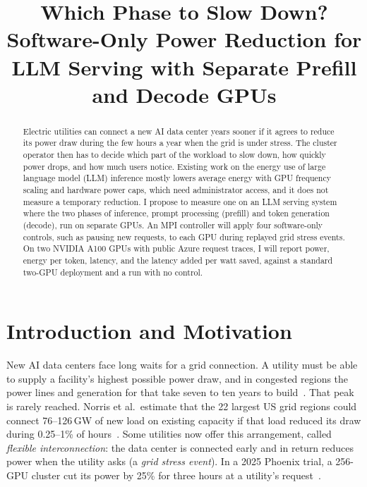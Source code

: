 \documentclass[conference,10pt]{IEEEtran}
\begin{document}
\title{Which Phase to Slow Down? Software-Only Power Reduction for LLM Serving with Separate Prefill and Decode GPUs}

\author{
}

\maketitle

\begin{abstract}
Electric utilities can connect a new AI data center years sooner if it agrees to reduce its power draw during the few hours a year when the grid is under stress. The cluster operator then has to decide which part of the workload to slow down, how quickly power drops, and how much users notice. Existing work on the energy use of large language model (LLM) inference mostly lowers average energy with GPU frequency scaling and hardware power caps, which need administrator access, and it does not measure a temporary reduction. I propose to measure one on an LLM serving system where the two phases of inference, prompt processing (prefill) and token generation (decode), run on separate GPUs. An MPI controller will apply four software-only controls, such as pausing new requests, to each GPU during replayed grid stress events. On two NVIDIA A100 GPUs with public Azure request traces, I will report power, energy per token, latency, and the latency added per watt saved, against a standard two-GPU deployment and a run with no control.
\end{abstract}

\section{Introduction and Motivation}
New AI data centers face long waits for a grid connection. A utility must be able to supply a facility's highest possible power draw, and in congested regions the power lines and generation for that take seven to ten years to build~\cite{norris2025rethinking}. That peak is rarely reached. Norris et al.\ estimate that the 22 largest US grid regions could connect 76--126\,GW of new load on existing capacity if that load reduced its draw during 0.25--1\% of hours~\cite{norris2025rethinking}. Some utilities now offer this arrangement, called \emph{flexible interconnection}: the data center is connected early and in return reduces power when the utility asks (a \emph{grid stress event}). In a 2025 Phoenix trial, a 256-GPU cluster cut its power by 25\% for three hours at a utility's request~\cite{colangelo2025phoenix}.
\end{document}
